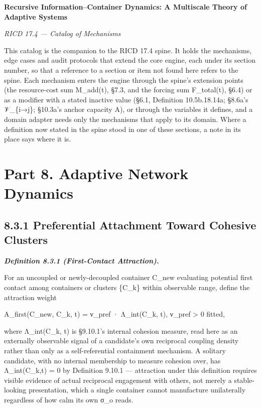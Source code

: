 \documentclass[
]{article}
\author{}
\date{}
\begin{document}
\textbf{Recursive Information--Container Dynamics: A Multiscale Theory
of Adaptive Systems}

\emph{RICD 17.4 --- Catalog of Mechanisms}

This catalog is the companion to the RICD 17.4 spine. It holds the
mechanisms, edge cases and audit protocols that extend the core engine,
each under its section number, so that a reference to a section or item
not found here refers to the spine. Each mechanism enters the engine
through the spine's extension points (the resource-cost sum M\_add(t),
§7.3, and the forcing sum F\_total(t), §6.4) or as a modifier with a
stated inactive value (§6.1, Definition 10.5b.18.14a; §8.6a's
𝒱\_\{i→j\}; §10.3a's anchor capacity A), or through the variables it
defines, and a domain adapter needs only the mechanisms that apply to
its domain. Where a definition now stated in the spine stood in one of
these sections, a note in its place says where it is.

\hypertarget{part-8.-adaptive-network-dynamics}{%
\section{Part 8. Adaptive Network
Dynamics}\label{part-8.-adaptive-network-dynamics}}

\hypertarget{preferential-attachment-toward-cohesive-clusters}{%
\subsection{8.3.1 Preferential Attachment Toward Cohesive
Clusters}\label{preferential-attachment-toward-cohesive-clusters}}

\emph{\textbf{Definition 8.3.1 (First-Contact Attraction).}}

For an uncoupled or newly-decoupled container C\_new evaluating
potential first contact among containers or clusters \{C\_k\} within
observable range, define the attraction weight

A\_first(C\_new, C\_k, t) = ν\_pref · Λ\_int(C\_k, t), ν\_pref
\textgreater{} 0 fitted,

where Λ\_int(C\_k, t) is §9.10.1's internal cohesion measure, read here
as an externally observable signal of a candidate's own reciprocal
coupling density rather than only as a self-referential containment
mechanism. A solitary candidate, with no internal membership to measure
cohesion over, has Λ\_int(C\_k,t) = 0 by Definition 9.10.1 ---
attraction under this definition requires visible evidence of actual
reciprocal engagement with others, not merely a stable-looking
presentation, which a single container cannot manufacture unilaterally
regardless of how calm its own σ\_o reads.
\end{document}
